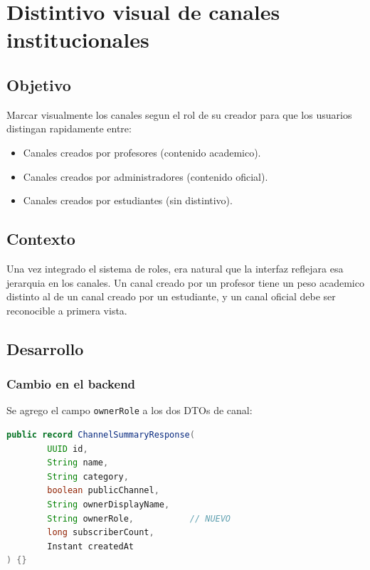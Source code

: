 \chapter{Distintivo visual de canales institucionales}
\label{ch:badges}

\section{Objetivo}

Marcar visualmente los canales segun el rol de su creador para que los usuarios distingan rapidamente entre:

\begin{itemize}[leftmargin=*]
  \item Canales creados por profesores (contenido academico).
  \item Canales creados por administradores (contenido oficial).
  \item Canales creados por estudiantes (sin distintivo).
\end{itemize}

\section{Contexto}

Una vez integrado el sistema de roles, era natural que la interfaz reflejara esa jerarquia en los canales. Un canal creado por un profesor tiene un peso academico distinto al de un canal creado por un estudiante, y un canal oficial debe ser reconocible a primera vista.

\section{Desarrollo}

\subsection{Cambio en el backend}

Se agrego el campo \texttt{ownerRole} a los dos DTOs de canal:

\begin{lstlisting}[language=Java]
public record ChannelSummaryResponse(
        UUID id,
        String name,
        String category,
        boolean publicChannel,
        String ownerDisplayName,
        String ownerRole,           // NUEVO
        long subscriberCount,
        Instant createdAt
) {}
\end{lstlisting}

